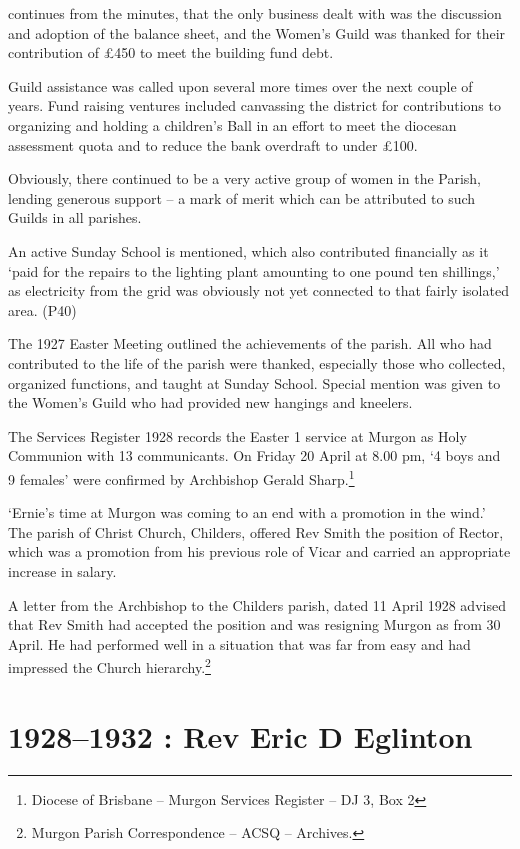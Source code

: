 continues from the minutes, that the only business dealt with was the discussion and adoption of the balance sheet, and the Women's Guild was thanked for their contribution of £450 to meet the building fund debt.

Guild assistance was called upon several more times over the next couple of years. Fund raising ventures included canvassing the district for contributions to organizing and holding a children's Ball in an effort to meet the diocesan assessment quota and to reduce the bank overdraft to under £100.

Obviously, there continued to be a very active group of women in the Parish, lending generous support -- a mark of merit which can be attributed to such Guilds in all parishes.

An active Sunday School is mentioned, which also contributed financially as it `paid for the repairs to the lighting plant amounting to one pound ten shillings,' as electricity from the grid was obviously not yet connected to that fairly isolated area. (P40)

The 1927 Easter Meeting outlined the achievements of the parish. All who had contributed to the life of the parish were thanked, especially those who collected, organized functions, and taught at Sunday School. Special mention was given to the Women's Guild who had provided new hangings and kneelers.

The Services Register 1928 records the Easter 1 service at Murgon as Holy Communion with 13 communicants. On Friday 20 April at 8.00 pm, `4 boys and 9 females' were confirmed by Archbishop Gerald Sharp.\footnote{Diocese of Brisbane -- Murgon Services Register -- DJ 3, Box 2}

`Ernie's time at Murgon was coming to an end with a promotion in the wind.' The parish of Christ Church, Childers, offered Rev Smith the position of Rector, which was a promotion from his previous role of Vicar and carried an appropriate increase in salary.

A letter from the Archbishop to the Childers parish, dated 11 April 1928 advised that Rev Smith had accepted the position and was resigning Murgon as from 30 April. He had performed well in a situation that was far from easy and had impressed the Church hierarchy.\footnote{Murgon Parish Correspondence -- ACSQ -- Archives.}

\hypertarget{rev-eric-d-eglinton}{%
\chapter{1928--1932 : Rev Eric D Eglinton}\label{rev-eric-d-eglinton}}

